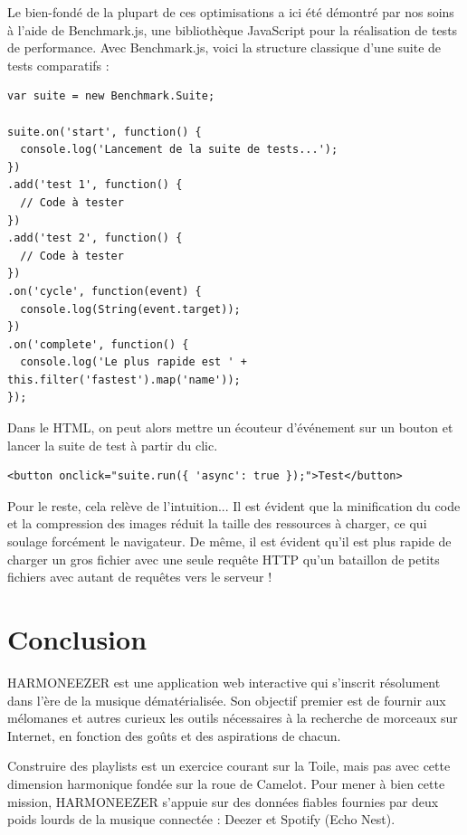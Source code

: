 \documentclass[a4paper,12pt]{article}
\begin{document}
Le bien-fondé de la plupart de ces optimisations a ici été démontré par nos soins à l'aide de Benchmark.js, une bibliothèque JavaScript pour la réalisation de tests de performance. Avec Benchmark.js, voici la structure classique d'une suite de tests comparatifs :

\begin{lstlisting}
var suite = new Benchmark.Suite;

suite.on('start', function() {
  console.log('Lancement de la suite de tests...');
})
.add('test 1', function() {
  // Code à tester
})
.add('test 2', function() {
  // Code à tester
})
.on('cycle', function(event) {
  console.log(String(event.target));
})
.on('complete', function() {
  console.log('Le plus rapide est ' + this.filter('fastest').map('name'));
});
\end{lstlisting}

Dans le HTML, on peut alors mettre un écouteur d'événement sur un bouton et lancer la suite de test à partir du clic.

\begin{lstlisting}
<button onclick="suite.run({ 'async': true });">Test</button>
\end{lstlisting}

Pour le reste, cela relève de l'intuition... Il est évident que la minification du code et la compression des images réduit la taille des ressources à charger, ce qui soulage forcément le navigateur. De même, il est évident qu'il est plus rapide de charger un gros fichier avec une seule requête HTTP qu'un bataillon de petits fichiers avec autant de requêtes vers le serveur !

\newpage


\part*{Conclusion}

HARMONEEZER est une application web interactive qui s'inscrit résolument dans l'ère de la musique dématérialisée. Son objectif premier est de fournir aux mélomanes et autres curieux les outils nécessaires à la recherche de morceaux sur Internet, en fonction des goûts et des aspirations de chacun.

Construire des playlists est un exercice courant sur la Toile, mais pas avec cette dimension harmonique fondée sur la roue de Camelot. Pour mener à bien cette mission, HARMONEEZER s'appuie sur des données fiables fournies par deux poids lourds de la musique connectée : Deezer et Spotify (Echo Nest).
\end{document}
